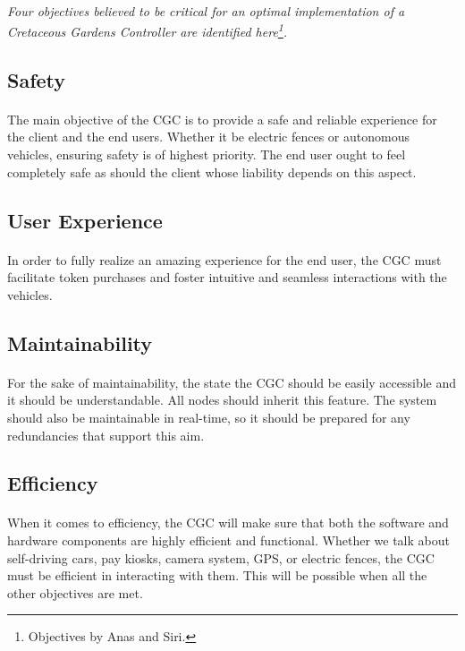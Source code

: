 \documentclass[12pt]{article}
\begin{document}
\paragraph{} \textit{Four objectives believed to be critical for an 
optimal implementation of a \textit{Cretaceous Gardens Controller} are identified here\footnote{Objectives by Anas and Siri.}.}
 
	\subsection{Safety}\label{saf}
	\paragraph{}The main objective of the CGC is to provide a safe and reliable 
	experience for the client and the end users. Whether it be electric fences 
	or autonomous vehicles, ensuring safety is of highest priority. The end user
	ought to feel completely safe as should the client whose liability depends on
	this aspect.

	\subsection{User Experience}\label{use}
	\paragraph{} In order to fully realize an amazing experience for the end user,
	the CGC must facilitate token purchases and foster intuitive and seamless interactions
	with the vehicles. 

	\subsection{Maintainability}\label{mai}
	\paragraph{} For the sake of maintainability, the state the CGC should be easily
	accessible and it should be understandable. All nodes should inherit this feature. 
	The system should also be maintainable in real-time, so it should be prepared for
	any redundancies that support this aim.
	
	\subsection{Efficiency}\label{eff}
	\paragraph{}When it comes to efficiency, the CGC will make sure that both 
	the software and hardware components are highly efficient and functional. 
	Whether we talk about self-driving cars, pay kiosks, camera system, GPS, 
	or electric fences, the CGC must be efficient in interacting with them. 
	This will be possible when all the other objectives are met.  
\end{document}
